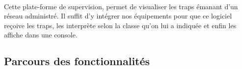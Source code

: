 \documentclass[12pt,a4paper,notitlepage]{article}
\begin{document}
\paragraph{}Cette plate-forme de supervision, permet de visualiser les traps émanant d'un réseau administré. Il suffit d'y intégrer nos équipements pour que ce logiciel reçoive les traps, les interprète selon la classe qu'on lui a indiquée et enfin les affiche dans une console.

\subsection{Parcours des fonctionnalités}


\end{document}

